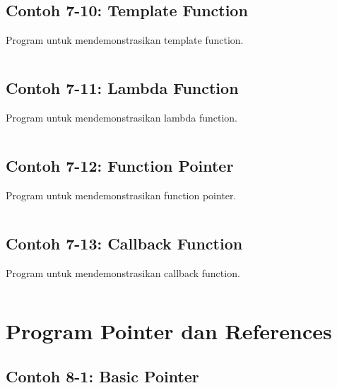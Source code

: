 \subsection{Contoh 7-10: Template Function}

Program untuk mendemonstrasikan template function.

\begin{lstlisting}[language=c++, caption=Template Function]

\end{lstlisting}

\subsection{Contoh 7-11: Lambda Function}

Program untuk mendemonstrasikan lambda function.

\begin{lstlisting}[language=c++, caption=Lambda Function]

\end{lstlisting}

\subsection{Contoh 7-12: Function Pointer}

Program untuk mendemonstrasikan function pointer.

\begin{lstlisting}[language=c++, caption=Function Pointer]

\end{lstlisting}

\subsection{Contoh 7-13: Callback Function}

Program untuk mendemonstrasikan callback function.

\begin{lstlisting}[language=c++, caption=Callback Function]

\end{lstlisting}

\section{Program Pointer dan References}

\subsection{Contoh 8-1: Basic Pointer}

